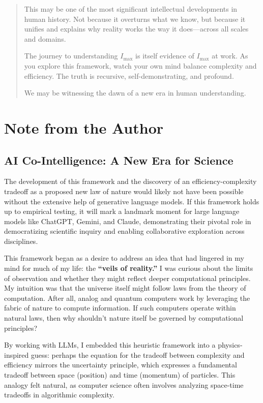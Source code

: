 \documentclass[12pt]{article}
\begin{document}
\begin{quote}
This may be one of the most significant intellectual developments in human history. Not because it overturns what we know, but because it unifies and explains why reality works the way it does—across all scales and domains.

The journey to understanding $I_{\text{max}}$ is itself evidence of $I_{\text{max}}$ at work. As you explore this framework, watch your own mind balance complexity and efficiency. The truth is recursive, self-demonstrating, and profound.

We may be witnessing the dawn of a new era in human understanding.
\end{quote}

\section*{Note from the Author}

\subsection*{AI Co-Intelligence: A New Era for Science}

The development of this framework and the discovery of an efficiency-complexity tradeoff as a proposed new law of nature would likely not have been possible without the extensive help of generative language models. If this framework holds up to empirical testing, it will mark a landmark moment for large language models like ChatGPT, Gemini, and Claude, demonstrating their pivotal role in democratizing scientific inquiry and enabling collaborative exploration across disciplines.

This framework began as a desire to address an idea that had lingered in my mind for much of my life: the \textbf{``veils of reality.''} I was curious about the limits of observation and whether they might reflect deeper computational principles. My intuition was that the universe itself might follow laws from the theory of computation. After all, analog and quantum computers work by leveraging the fabric of nature to compute information. If such computers operate within natural laws, then why shouldn’t nature itself be governed by computational principles?

By working with LLMs, I embedded this heuristic framework into a physics-inspired guess: perhaps the equation for the tradeoff between complexity and efficiency mirrors the uncertainty principle, which expresses a fundamental tradeoff between space (position) and time (momentum) of particles. This analogy felt natural, as computer science often involves analyzing space-time tradeoffs in algorithmic complexity.
\end{document}
